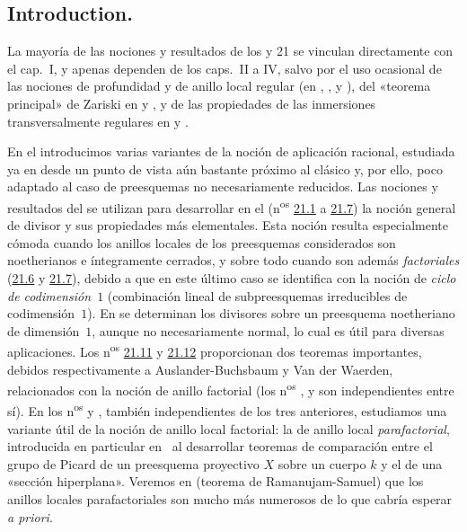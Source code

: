 \subsection{Introduction.}
\label{IV.20.0}

La mayoría de las nociones y resultados de los \textsection{} y 21 se vinculan directamente con el cap.~I, y apenas dependen de los caps.~II a IV, salvo por el uso ocasional de las nociones de profundidad y de anillo local regular (en , ,  y ), del «teorema principal» de Zariski en  y , y de las propiedades de las inmersiones transversalmente regulares en  y .

En el  introducimos varias variantes de la noción de aplicación racional, estudiada ya en  desde un punto de vista aún bastante próximo al clásico y, por ello, poco adaptado al caso de preesquemas no necesariamente reducidos.
Las nociones y resultados del  se utilizan para desarrollar en el  (n\textsuperscript{os} \hyperref[IV.21.1]{21.1} a \hyperref[IV.21.7]{21.7}) la noción general de divisor y sus propiedades más elementales.
Esta noción resulta especialmente cómoda cuando los anillos locales de los preesquemas considerados son noetherianos e íntegramente cerrados, y sobre todo cuando son además \emph{factoriales} (\hyperref[IV.21.6]{21.6} y \hyperref[IV.21.7]{21.7}), debido a que en este último caso se identifica con la noción de \emph{ciclo de codimensión~$1$} (combinación lineal de subpreesquemas irreducibles de codimensión~$1$).
En  se determinan los divisores sobre un preesquema noetheriano de dimensión~$1$, aunque no necesariamente normal, lo cual es útil para diversas aplicaciones.
Los n\textsuperscript{os} \hyperref[IV.21.11]{21.11} y \hyperref[IV.21.12]{21.12} proporcionan dos teoremas importantes, debidos respectivamente a Auslander-Buchsbaum y Van der Waerden, relacionados con la noción de anillo factorial (los n\textsuperscript{os} ,  y  son independientes entre sí).
En los n\textsuperscript{os}  y , también independientes de los tres anteriores, estudiamos una variante útil de la noción de anillo local factorial: la de anillo local \emph{parafactorial}, introducida en particular en~\cite{IV-41} al desarrollar teoremas de comparación entre el grupo de Picard de un preesquema proyectivo $X$ sobre un cuerpo $k$ y el de una «sección hiperplana».
Veremos en  (teorema de Ramanujam-Samuel) que los anillos locales parafactoriales son mucho más numerosos de lo que cabría esperar \emph{a priori}.


